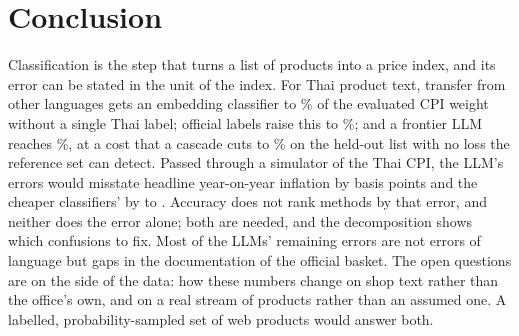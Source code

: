 \section{Conclusion}\label{sec:conclusion}

Classification is the step that turns a list of products into a price index, and its error
can be stated in the unit of the index. For Thai product text, transfer from other languages
gets an embedding classifier to \AccWEfiveMLPZeroShot\% of the evaluated CPI weight without a
single Thai label; official labels raise this to \AccWEfiveMLP\%; and a frontier LLM reaches
\AccWOpus\%, at a cost that a cascade cuts to \CostPctCasEfiveMLPOpus\% on the held-out list with no loss
the reference set can detect. Passed
through a simulator of the Thai CPI, the LLM's errors would misstate headline year-on-year
inflation by \BpYoyRmseHeadlineOpus{} basis points and the cheaper classifiers' by
\BpYoyRmseHeadlineBgeMLP{} to \BpYoyRmseHeadlineEfiveMLP. Accuracy does not rank methods by that error, and neither does the
error alone; both are needed, and the decomposition shows which confusions to fix. Most of
the LLMs' remaining errors are not errors of language but gaps in the documentation of the
official basket. The open questions are on the side of the data: how these numbers change
on shop text rather than the office's own, and on a real stream of products rather than an
assumed one. A labelled, probability-sampled set of web products would answer both.
